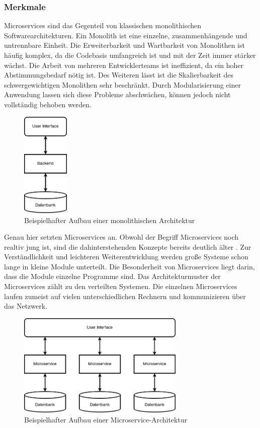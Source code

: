 \subsubsection{Merkmale}

Microservices sind das Gegenteil von klassischen monolithischen Softwarearchitekturen. Ein Monolith ist eine einzelne, zusammenhängende und untrennbare Einheit. Die Erweiterbarkeit und Wartbarkeit von Monolithen ist häufig komplex, da die Codebasis umfangreich ist und mit der Zeit immer stärker wächst. Die Arbeit von mehreren Entwicklerteams ist ineffizient, da ein hoher Abstimmungsbedarf nötig ist. Des Weiteren lässt ist die Skalierbarkeit des schwergewichtigen Monolithen sehr beschränkt. Durch Modularisierung einer Anwendung lassen sich diese Probleme abschwächen, können jedoch nicht vollständig behoben werden.

\begin{figure}[H] 
    \centering
    \includegraphics[width=0.2\textwidth]{figures/AufbauMonolith.png}
    \caption{Beispielhafter Aufbau einer monolithischen Architektur}
\end{figure}

Genau hier setzten Microservices an. Obwohl der Begriff Microservices noch realtiv jung ist, sind die dahinterstehenden Konzepte bereits deutlich älter \parencite[vgl.][S. 15]{newmanMicroservices2015}. Zur Verständlichkeit und leichteren Weiterentwicklung werden große Systeme schon lange in kleine Module unterteilt. Die Besonderheit von Microservices liegt darin, dass die Module einzelne Programme sind. Das Architekturmuster der Microservices zählt zu den verteilten Systemen. Die einzelnen Microservices laufen zumeist auf vielen unterschiedlichen Rechnern und kommunizieren über das Netzwerk.

\begin{figure}[H] 
    \centering
    \includegraphics[width=0.71\textwidth]{figures/AufbauMicroservices.png}
    \caption{Beispielhafter Aufbau einer Microservice-Architektur}
\end{figure}


